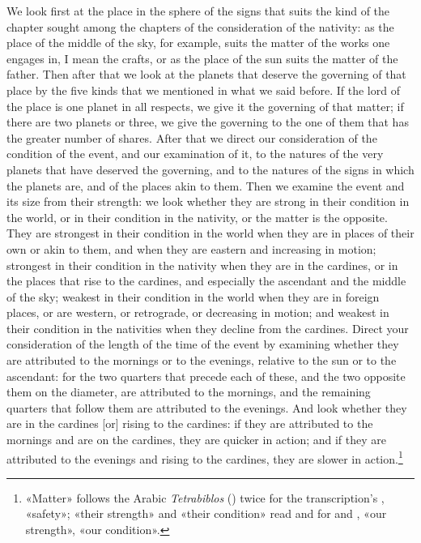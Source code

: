 \documentclass[11pt]{article}
\newcommand{\Fol}[1]{\marginpar{\footnotesize\color{gray}f.\,#1}}
\begin{document}
\par \Fol{36v}We look first at the place in the sphere of the signs that suits the kind of the chapter sought among the chapters of the consideration of the nativity: as the place of the middle of the sky, for example, suits the matter of the works one engages in, I mean the crafts, or as the place of the sun suits the matter of the father. Then after that we look at the planets that deserve the governing of that place by the five kinds that we mentioned in what we said before. If the lord of the place is one planet in all respects, we give it the governing of that matter; if there are two planets or three, we give the governing to the one of them that has the greater number of shares. After that we direct our consideration of the condition of the event, and our examination of it, to the natures of the very planets that have deserved the governing, and to the natures of the signs in which the planets are, and of the places akin to them. Then we examine the event and its size from their strength: we look whether they are strong in their condition in the world, or in their condition in the nativity, or the matter is the opposite. They are strongest in their condition in the world when they are in places of their own or akin to them, and when they are eastern and increasing in motion; strongest in their condition in the nativity when they are in the cardines, or in the places that rise to the cardines, and especially the ascendant and the middle of the sky; weakest in their condition in the world when they are in foreign places, or are western, or retrograde, or decreasing in motion; and weakest in their condition in the nativities when they decline from the cardines. Direct your consideration of the length of the time of the event by examining whether they are attributed to the mornings or to the evenings, relative to the sun or to the ascendant: for the two quarters that precede each of these, and the two opposite them on the diameter, are attributed to the mornings, and the remaining quarters that follow them are attributed to the evenings. And look whether they are in the cardines [or] rising to the cardines: if they are attributed to the mornings and are on the cardines, they are quicker in action; and if they are attributed to the evenings and rising to the cardines, they are slower in action.\footnote{«Matter» follows the Arabic \emph{Tetrabiblos} () twice for the transcription's , «safety»; «their strength» and «their condition» read  and  for  and , «our strength», «our condition».}\par
\end{document}
